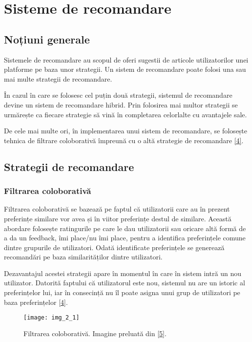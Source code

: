\section{Sisteme de recomandare}

\subsection{Noțiuni generale}

Sistemele de recomandare au scopul de oferi sugestii de articole utilizatorilor unei platforme pe baza unor strategii. Un sistem de recomandare poate folosi una sau mai multe strategii de recomandare. 

În cazul în care se folosesc cel puțin două strategii, sistemul de recomandare devine un sistem de recomandare hibrid. Prin folosirea mai multor strategii se urmărește ca fiecare strategie să vină în completarea celorlalte cu avantajele sale.

De cele mai multe ori, în implementarea unui sistem de recomandare, se folosește tehnica de filtrare coloborativă împreună cu o altă strategie de recomandare \hyperlink{ErionCanoMaurizioMorisio}{[4]}.

\subsection{Strategii de recomandare}

\subsubsection*{Filtrarea coloborativă}

Filtrarea coloborativă se bazează pe faptul că utilizatorii care au în prezent preferințe similare vor avea și în viitor preferințe destul de similare. Această abordare folosește ratingurile pe care le dau utilizatorii sau oricare altă formă de a da un feedback, îmi place/nu îmi place, pentru a identifica preferințele comune dintre grupurile de utilizatori. Odată identificate preferințele se generează recomandări pe baza similarităților dintre utilizatori. 

Dezavantajul acestei strategii apare în momentul în care în sistem intră un nou utilizator. Datorită faptului că utilizatorul este nou, sistemul nu are un istoric al preferințelor lui, iar în consecință nu îl poate asigna unui grup de utilizatori pe baza preferințelor \hyperlink{ErionCanoMaurizioMorisio}{[4]}.

\begin{figure}[!h]
	\centering
	\texttt{[image: img\_2\_1]}
	\caption[Filtrarea coloborativă]{Filtrarea coloborativă. Imagine preluată din \hyperlink{datameetsmedia}{[5]}.}
\end{figure} 

